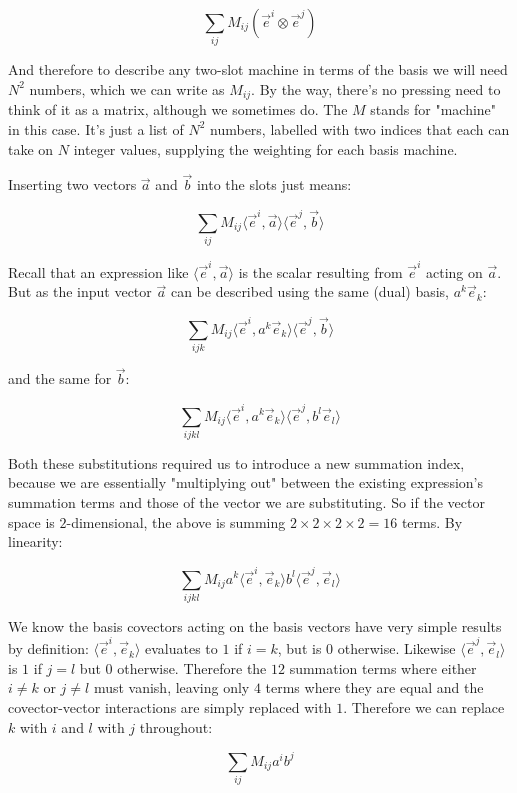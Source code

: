 $$
\sum_{ij} M_{ij} (\vec{e}^i \otimes \vec{e}^j)
$$

And therefore to describe any two-slot machine in terms of the basis we will need $N^2$ numbers, which we can write as $M_{ij}$. By the way, there's no pressing need to think of it as a matrix, although we sometimes do. The $M$ stands for "machine" in this case. It's just a list of $N^2$ numbers, labelled with two indices that each can take on $N$ integer values, supplying the weighting for each basis machine.

Inserting two vectors $\vec{a}$ and $\vec{b}$ into the slots just means:

$$
\sum_{ij} M_{ij} \langle \vec{e}^i,\vec{a} \rangle \langle \vec{e}^j,\vec{b} \rangle
$$

Recall that an expression like $\langle \vec{e}^i,\vec{a} \rangle$ is the scalar resulting from $\vec{e}^i$ acting on $\vec{a}$. But as the input vector $\vec{a}$ can be described using the same (dual) basis, $a^k \vec{e}_k$: 

$$
\sum_{ijk} M_{ij} \langle \vec{e}^i, a^k \vec{e}_k \rangle \langle \vec{e}^j,\vec{b} \rangle
$$

and the same for $\vec{b}$:

$$
\sum_{ijkl} M_{ij} \langle \vec{e}^i, a^k \vec{e}_k \rangle \langle \vec{e}^j,b^l \vec{e}_l \rangle
$$

Both these substitutions required us to introduce a new summation index, because we are essentially "multiplying out" between the existing expression's summation terms and those of the vector we are substituting. So if the vector space is $2$-dimensional, the above is summing $2 \times 2 \times 2 \times 2 = 16$ terms. By linearity:

$$
\sum_{ijkl} M_{ij} a^k \langle \vec{e}^i, \vec{e}_k \rangle b^l \langle \vec{e}^j, \vec{e}_l \rangle
$$

We know the basis covectors acting on the basis vectors have very simple results by definition: $\langle \vec{e}^i, \vec{e}_k \rangle$ evaluates to $1$ if $i = k$, but is $0$ otherwise. Likewise $\langle \vec{e}^j, \vec{e}_l \rangle$ is $1$ if $j = l$ but $0$ otherwise. Therefore the $12$ summation terms where either $i \ne k$ or $j \ne l$ must vanish, leaving only $4$ terms where they are equal and the covector-vector interactions are simply replaced with $1$. Therefore we can replace $k$ with $i$ and $l$ with $j$ throughout:

\begin{equation}
    \sum_{ij} M_{ij} a^i b^j
        \label{eqn:two-slot-computation}
\end{equation}


